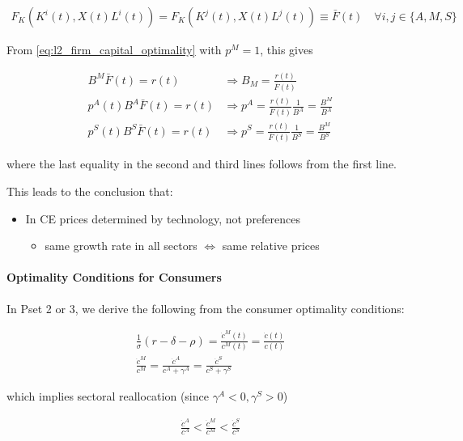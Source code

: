 \documentclass[10pt]{article}
\begin{document}
\begin{align}
    F_K\left(K^i(t), X(t) L^i(t)\right)=F_K\left(K^j(t), X(t) L^j(t)\right) \equiv \bar{F}(t) \quad \forall i, j \in\{A, M, S\}
\end{align}

From \eqref{eq:l2_firm_capital_optimality} with $p^M = 1$, this gives 

\begin{align}
    B^M \bar{F}(t)=r(t) &\Rightarrow B_M = \frac{r(t)}{\bar{F}(t)} \\
    p^A(t) B^A \bar{F}(t)=r(t) &\Rightarrow p^A = \frac{r(t)}{\bar{F}(t)} \frac{1}{B^A} = \frac{B^M}{B^A} \\
    p^S(t) B^S \bar{F}(t)=r(t) &\Rightarrow p^S = \frac{r(t)}{\bar{F}(t)} \frac{1}{B^S} = \frac{B^M}{B^S}
\end{align}

where the last equality in the second and third lines follows from the first line.

This leads to the conclusion that:

\begin{itemize}
    \item In CE prices determined by technology, not preferences
        \begin{itemize}
            \item same growth rate in all sectors $\Longleftrightarrow$ same relative prices
        \end{itemize}
\end{itemize}

\paragraph{Optimality Conditions for Consumers}

In Pset 2 or 3, we derive the following from the consumer optimality conditions:

\begin{align}
    \frac{1}{\sigma}(r-\delta-\rho)=\frac{\dot{c}^M(t)}{c^M(t)}=\frac{\dot{c}(t)}{c(t)} \\
    \frac{\dot{c}^M}{c^M}=\frac{\dot{c}^A}{c^A+\gamma^A}=\frac{\dot{c}^S}{c^S+\gamma^S}
\end{align}

which implies sectoral reallocation (since $\gamma^A<0, \gamma^S>0$)

\begin{align}
    \frac{\dot{c}^A}{c^A}<\frac{\dot{c}^M}{c^M}<\frac{\dot{c}^S}{c^S}
\end{align}
\end{document}
